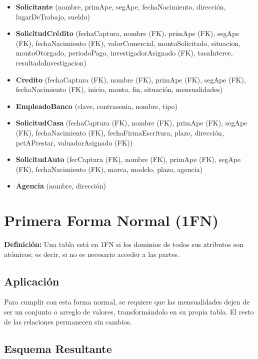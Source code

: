 \documentclass[12pt, a4paper]{article}
\begin{document}
\begin{itemize}[leftmargin=2cm, label={--}]
    \item \textbf{Solicitante} (nombre, primApe, segApe, fechaNacimiento, dirección, lugarDeTrabajo, sueldo)
    \item \textbf{SolicitudCrédito} (fechaCaptura, nombre (FK), primApe (FK), segApe (FK), fechaNacimiento (FK), valorComercial, montoSolicitado, situacion, montoOtorgado, periodoPago, investigadorAsignado (FK), tasaInteres, resultadoInvestigacion)
    \item \textbf{Credito} (fechaCaptura (FK), nombre (FK), primApe (FK), segApe (FK), fechaNacimiento (FK), inicio, monto, fin, situación, mensualidades)
    \item \textbf{EmpleadoBanco} (clave, contrasenia, nombre, tipo)
    \item \textbf{SolicitudCasa} (fechaCaptura (FK), nombre (FK), primApe (FK), segApe (FK), fechaNacimiento (FK), fechaFirmaEscritura, plazo, dirección, pctAPrestar, valuadorAsignado (FK))
    \item \textbf{SolicitudAuto} (fecCaptura (FK), nombre (FK), primApe (FK), segApe (FK), fechaNacimiento (FK), marca, modelo, plazo, agencia)
    \item \textbf{Agencia} (nombre, dirección)
\end{itemize}

\newpage

\section{Primera Forma Normal (1FN)}

\textbf{Definición:} Una tabla está en 1FN si los dominios de todos sus atributos son atómicos; es decir, si no es necesario acceder a las partes.

\subsection*{Aplicación}

Para cumplir con esta forma normal, se requiere que las mensualidades dejen de ser un conjunto o arreglo de valores, transformándolo en su propia tabla. El resto de las relaciones permanecen sin cambios.

\subsection*{Esquema Resultante}
\end{document}
